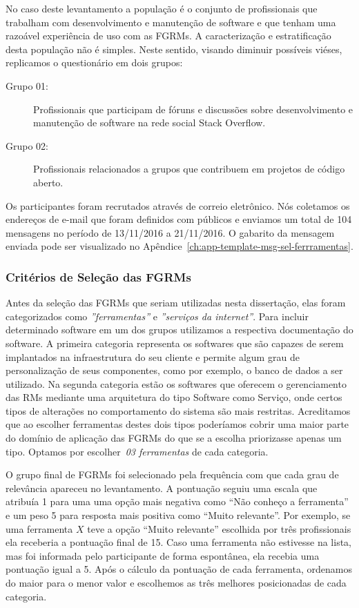 No caso deste levantamento a população é o conjunto de profissionais que
trabalham com desenvolvimento e manutenção de software e que tenham uma
razoável experiência de uso com as FGRMs. A caracterização e estratificação
desta população não é simples. Neste sentido, visando diminuir possíveis
viéses, replicamos o questionário em dois grupos:

\begin{description}
	\item[Grupo 01:] Profissionais que participam de fóruns e discussões sobre
		desenvolvimento e manutenção de software na rede social Stack Overflow.
	\item[Grupo 02:] Profissionais relacionados a grupos que contribuem em
		projetos de código aberto.
\end{description}

Os participantes foram recrutados através de correio eletrônico. Nós coletamos
os endereços de e-mail que foram definidos com públicos e enviamos um total de
104 mensagens no período de 13/11/2016 a 21/11/2016. O gabarito da mensagem
enviada pode ser visualizado no
Apêndice~\ref{ch:app-template-msg-sel-ferrramentas}.

\subsubsection{Critérios de Seleção das FGRMs}\label{ssub:metodologia_criterios_selecao}

Antes da seleção das FGRMs que seriam utilizadas nesta dissertação, elas foram
categorizados como \textit{''ferramentas''} e \textit{''serviços da
    internet''}.  Para incluir determinado software em um dos grupos utilizamos
a respectiva documentação do software. A primeira categoria representa os
softwares que são capazes de serem implantados na infraestrutura do seu cliente
e permite algum grau de personalização de seus componentes, como por exemplo, o
banco de dados a ser utilizado. Na segunda categoria estão os softwares que
oferecem o gerenciamento das RMs mediante uma arquitetura do tipo Software como
Serviço, onde certos tipos de alterações no comportamento do sistema são mais
restritas. Acreditamos que ao escolher ferramentas destes dois tipos poderíamos
cobrir uma maior parte do domínio de aplicação das FGRMs do que se a escolha
priorizasse apenas um tipo.  Optamos por escolher~\textit{03 ferramentas} de
cada categoria.

O grupo final de FGRMs foi selecionado pela frequência com que cada grau de
relevância apareceu no levantamento. A pontuação seguiu uma escala que atribuía
1 para uma uma opção mais negativa como ``Não conheço a ferramenta'' e um peso 5
para resposta mais positiva como ``Muito relevante''.  Por exemplo, se uma
ferramenta $X$ teve a opção ``Muito relevante'' escolhida por três profissionais
ela receberia a pontuação final de 15. Caso uma ferramenta não estivesse na
lista, mas foi informada pelo participante de forma espontânea, ela recebia uma
pontuação igual a 5. Após o cálculo da pontuação de cada ferramenta, ordenamos
do maior para o menor valor e escolhemos as três melhores posicionadas de cada
categoria.

